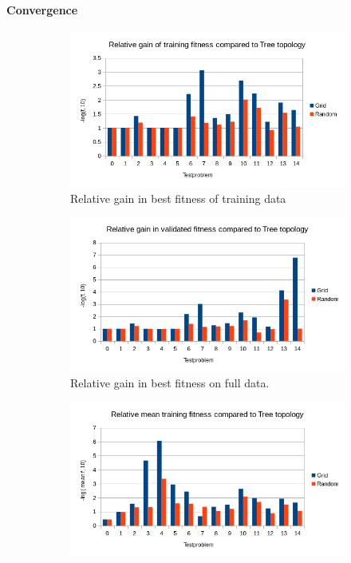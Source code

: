 \paragraph{Convergence}
\begin{figure}
    \centering
    \begin{subfigure}{0.6\textwidth}
    \centering
        \includegraphics[width=0.8\linewidth]{figures/distributedbesttraining.png}
        \caption{Relative gain in best fitness of training data}
    \end{subfigure}%
    \begin{subfigure}{0.6\textwidth}
    \centering
        \includegraphics[width=0.8\linewidth]{figures/distributedbestvalidated.png}
        \caption{Relative gain in best fitness on full data.}
    \end{subfigure}
        \begin{subfigure}{0.6\textwidth}
    \centering
        \includegraphics[width=0.8\linewidth]{figures/distributedmeantraining.png}

\end{subfigure}
\end{figure}
